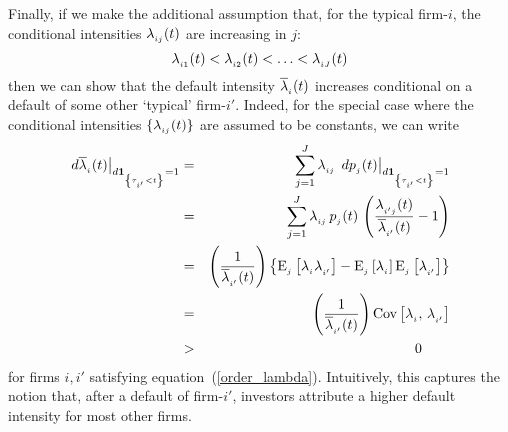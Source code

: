 \documentclass[titlepage,11pt]{article}
\def\bq{\begin{equation}}
\def\eq{\end{equation}}
\def\by{\begin{eqnarray}}
\def\ey{\end{eqnarray}}
\def\nn{\nonumber}
\begin{document}
Finally,  if we make the additional assumption that, for the typical
firm-$i$, the conditional intensities $\lambda_{_{{ij}}}(t)$ are
increasing in $j$: \bq\label{order_lambda} \lambda\sub{i1}(t) <
\lambda\sub{i2}(t) < \ldots < \lambda\sub{iJ}(t) \eq then we can
show that the default intensity $\overline{\lambda}_{_{{i}}}(t)$
increases conditional on a default of some other `typical'
firm-$i'$. Indeed, for the special case where the conditional
intensities $\{ \lambda_{_{{ij}}}(t) \}$ are assumed to be constants,
we can write \by \left. d\overline{\lambda}\sub{i}(t)
\right|_{d\ind{\tau\sub{i'} < t}=1} &=& \sum_{j=1}^{J}
\lambda\sub{ij} \, \left. dp\sub{j}(t)
\right|_{d\ind{\tau\sub{i'} < t}=1} \nn \\
%
&=& \sum_{j=1}^{J} \lambda\sub{ij} \, p\sub{j}(t) \, \left(
\frac{\lambda\sub{i'j}(t)}{\overline{\lambda}\sub{i'}(t)} - 1
\right)
\nn \\
%
&=& \left( \frac{1}{\overline{\lambda}\sub{i'}(t)}\right) \left\{
\mbox{E}\sub{j} \left[ \lambda\sub{i} \lambda\sub{i'}\right] -
\mbox{E}\sub{j} \left[ \lambda\sub{i} \right]  \mbox{E}\sub{j}
\left[ \lambda\sub{i'} \right] \right\}
\nn \\
%
&=& \left( \frac{1}{\overline{\lambda}\sub{i'}(t)}\right)
\mbox{Cov} \left[\lambda\sub{i}, \, \lambda\sub{i'} \right] \nn \\
&>& 0 \qquad \ey for firms $i, i'$ satisfying
equation~(\ref{order_lambda}).  Intuitively, this captures the
notion that, after a default of firm-$i'$, investors attribute a
higher default intensity for most other firms.
\end{document}

